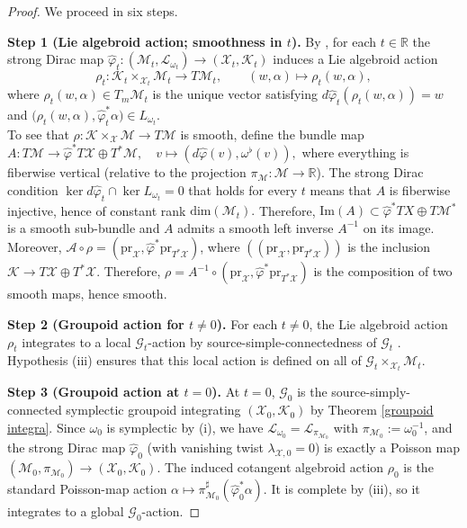 \documentclass[reqno]{amsart}
\theoremstyle{plain}
\theoremstyle{definition}
\newcommand{\R}{\mathbb{R}}
\newcommand{\G}{\mathcal{G}}
\newcommand{\too}{\longrightarrow}
\newcommand{\mtoo}{\longmapsto}
\newcommand{\M}{\mathcal{M}}
\renewcommand{\L}{\mathcal{L}}
\newcommand{\X}{\mathcal{X}}
\newcommand{\A}{\mathcal{A}}
\newcommand{\K}{\mathcal{K}}
\begin{document}
\begin{proof}
We proceed in six steps.
 
\medskip
\noindent\textbf{Step 1 (Lie algebroid action; smoothness in $t$).}
By \cite[Corollary 3.12]{bursztyn2005dirac}, for each $t \in \R$ the strong Dirac map $\hat\varphi_t \colon (\M_t, \L_{\omega_t}) \to (\X_t, \K_t)$
induces a Lie algebroid action
\[
   \rho_t \colon \K_t \times_{\X_t} \M_t \longrightarrow T\M_t,
   \qquad
   (w, \alpha) \longmapsto \rho_t(w, \alpha),
\]
where $\rho_t(w,\alpha) \in T_m \M_t$ is the unique vector satisfying
$d\hat\varphi_t(\rho_t(w,\alpha)) = w$ and
$\bigl(\rho_t(w,\alpha), \hat\varphi_t^{*}\alpha\bigr) \in L_{\omega_t}$.\\

To see that $\rho: \K \times_{\X} \M \too T\M$ is smooth, define the bundle map $A: T\M \too \hat\varphi^{*}T\X \oplus T^{*}\M, \quad v \mtoo (d\hat\varphi(v),\omega^{\flat}(v)),$ where everything is fiberwise vertical (relative to the projection $\pi_{\M}: \M \too \R$). The strong Dirac condition $\ker d\hat\varphi_t \cap \ker L_{\omega_t} = 0$ that holds for every $t$ means that $A$ is fiberwise injective, hence of constant rank $\text{dim}(\M_t).$ Therefore, $\mathrm{Im}(A) \subset \hat\varphi^{*}TX \oplus T\M^{*}$ is a smooth sub-bundle and $A$ admits a smooth left inverse $A^{-1}$ on its image. Moreover, $\A \circ \rho = (\mathrm{pr}_{\X}, \hat\varphi^{*}\mathrm{pr}_{T^{*}\X})$, where $((\mathrm{pr}_{\X},\mathrm{pr}_{T^{*}\X}))$ is the inclusion $\K \too T\X \oplus T^{*}\X.$ Therefore, $\rho = A^{-1} \circ (\mathrm{pr}_{\X},\hat\varphi^{*}\mathrm{pr}_{T^{*}\X})$ is the composition of two smooth maps, hence smooth. 
 
\medskip
\noindent\textbf{Step 2 (Groupoid action for $t \neq 0$).}
For each $t \neq 0$, the Lie algebroid action $\rho_t$ integrates to a local $\mathcal{G}_t$-action by source-simple-connectedness of $\mathcal{G}_t$ \cite[Theorem 4.1]{crainic2003integrability}. Hypothesis (iii) ensures that this local action is
defined on all of $\G_t \times_{\X_t} \M_t$.
 
\medskip
\noindent\textbf{Step 3 (Groupoid action at $t = 0$).}
At $t = 0$, $\mathcal{G}_0$ is the source-simply-connected symplectic groupoid integrating $(\mathcal{X}_0, \mathcal{K}_0)$ by Theorem \ref{groupoid integra}.
Since $\omega_0$ is symplectic by (i), we have $\L_{\omega_0} = \L_{\pi_{\M_0}}$ with $\pi_{\M_0} := \omega_0^{-1}$, and the strong Dirac map $\hat\varphi_0$
(with vanishing twist $\lambda_{\mathcal{X},0} = 0$) is exactly a Poisson map
$(\M_0, \pi_{\M_0}) \to (\X_0, \K_0)$. The induced cotangent
algebroid action $\rho_0$ is the standard Poisson-map action
$\alpha \mapsto \pi_{\M_0}^{\sharp}(\hat\varphi_0^{*}\alpha)$. It is complete by (iii), so it integrates to a global $\mathcal{G}_0$-action.
 

\end{proof}
\end{document}
